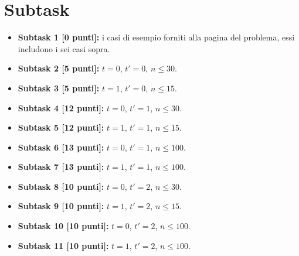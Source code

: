 \vspace{0.5cm}

\vspace{0.5cm}

\vspace{0.5cm}


\section*{Subtask}

  \begin{itemize}
    \item \textbf{Subtask 1 [0 punti]:} i casi di esempio forniti alla pagina del problema, essi includono i sei casi sopra.
    \item \textbf{Subtask 2 [5 punti]:} $t=0$, $t'=0$, $n \le 30$.
    \item \textbf{Subtask 3 [5 punti]:} $t=1$, $t'=0$, $n \le 15$.
      
    \item \textbf{Subtask 4 [12 punti]:} $t=0$, $t'=1$, $n \le 30$.
    \item \textbf{Subtask 5 [12 punti]:} $t=1$, $t'=1$, $n \le 15$.
    \item \textbf{Subtask 6 [13 punti]:} $t=0$, $t'=1$, $n \le 100$.
    \item \textbf{Subtask 7 [13 punti]:} $t=1$, $t'=1$, $n \le 100$.
      
    \item \textbf{Subtask 8 [10 punti]:} $t=0$, $t'=2$, $n \le 30$.
    \item \textbf{Subtask 9 [10 punti]:} $t=1$, $t'=2$, $n \le 15$.
    \item \textbf{Subtask 10 [10 punti]:} $t=0$, $t'=2$, $n \le 100$.
    \item \textbf{Subtask 11 [10 punti]:} $t=1$, $t'=2$, $n \le 100$.
  \end{itemize}
  
